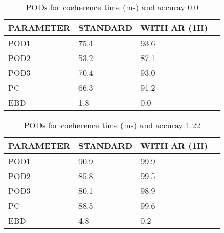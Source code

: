 \documentclass[11pt,english]{article}
\begin{document}
\begin{table}[]
\begin{center}
\begin{tabular}{|l|l|l|l|}
\hline
\multicolumn{1}{|c|}{\cellcolor[HTML]{C0C0C0}\textbf{PARAMETER}} & \multicolumn{1}{c|}{\cellcolor[HTML]{C0C0C0}\textbf{STANDARD}} & \multicolumn{1}{c|}{\cellcolor[HTML]{C0C0C0}\textbf{WITH AR (1H)}} \\
\hline
\cellcolor[HTML]{C0C0C0}POD1  & 75.4                                & 93.6         \\
\cellcolor[HTML]{C0C0C0}POD2  & 53.2                                & 87.1         \\
\cellcolor[HTML]{C0C0C0}POD3  & 70.4                                & 93.0         \\
\cellcolor[HTML]{C0C0C0}PC    & 66.3                                  & 91.2           \\
\cellcolor[HTML]{C0C0C0}EBD   & 1.8                                 & 0.0          \\
\hline
\end{tabular}
\caption{PODs for coeherence time (ms) and accuray 0.0}
\end{center}
\end{table}
\begin{table}[]
\begin{center}
\begin{tabular}{|l|l|l|l|}
\hline
\multicolumn{1}{|c|}{\cellcolor[HTML]{C0C0C0}\textbf{PARAMETER}} & \multicolumn{1}{c|}{\cellcolor[HTML]{C0C0C0}\textbf{STANDARD}} & \multicolumn{1}{c|}{\cellcolor[HTML]{C0C0C0}\textbf{WITH AR (1H)}} \\
\hline
\cellcolor[HTML]{C0C0C0}POD1  & 90.9                                & 99.9         \\
\cellcolor[HTML]{C0C0C0}POD2  & 85.8                                & 99.5         \\
\cellcolor[HTML]{C0C0C0}POD3  & 80.1                                & 98.9         \\
\cellcolor[HTML]{C0C0C0}PC    & 88.5                                  & 99.6           \\
\cellcolor[HTML]{C0C0C0}EBD   & 4.8                                 & 0.2          \\
\hline
\end{tabular}
\caption{PODs for coeherence time (ms) and accuray 1.22}
\end{center}
\end{table}
\end{document}
